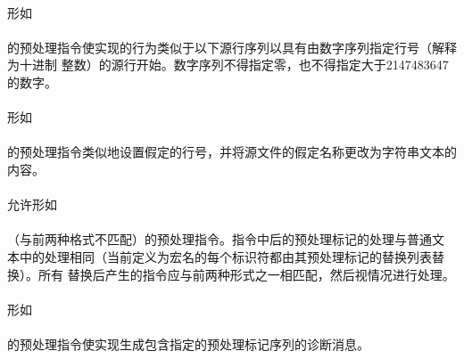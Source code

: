 {\paragraph{}
形如                                                                          \\
\mbox{\hspace{4em} }                  \\
的预处理指令使实现的行为类似于以下源行序列以具有由数字序列指定行号（解释为十进制
整数）的源行开始。数字序列不得指定零，也不得指定大于2147483647的数字。

\paragraph{}
形如                                                                          \\
\mbox{\hspace{4em} 
  \tm{\dq}\tm{\dq} }               \\
的预处理指令类似地设置假定的行号，并将源文件的假定名称更改为字符串文本的内容。

\paragraph{}
允许形如                                                                      \\
\mbox{\hspace{4em} }                       \\
（与前两种格式不匹配）的预处理指令。指令中后的预处理标记的处理与普通文
本中的处理相同（当前定义为宏名的每个标识符都由其预处理标记的替换列表替换）。所有
替换后产生的指令应与前两种形式之一相匹配，然后视情况进行处理。

\semantic
\paragraph{}
形如                                                                          \\
\mbox{\hspace{4em} }            \\
的预处理指令使实现生成包含指定的预处理标记序列的诊断消息。

}
